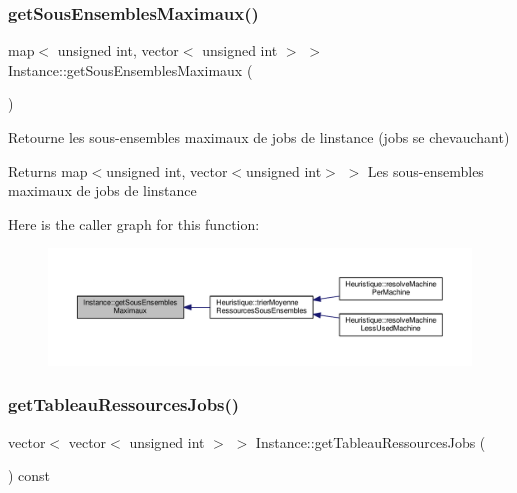 \subsubsection{\texorpdfstring{get\+Sous\+Ensembles\+Maximaux()}{getSousEnsemblesMaximaux()}}
{\footnotesize\ttfamily map$<$ unsigned int, vector$<$ unsigned int $>$ $>$ Instance\+::get\+Sous\+Ensembles\+Maximaux (\begin{DoxyParamCaption}{ }\end{DoxyParamCaption})}



Retourne les sous-\/ensembles maximaux de jobs de l\textquotesingle{}instance (jobs se chevauchant) 

\begin{DoxyReturn}{Returns}
map$<$unsigned int, vector$<$unsigned int$>$ $>$ Les sous-\/ensembles maximaux de jobs de l\textquotesingle{}instance 
\end{DoxyReturn}
Here is the caller graph for this function\+:\nopagebreak
\begin{figure}[H]
\begin{center}
\leavevmode
\includegraphics[width=350pt]{classInstance_a2011ff3253fcb1d2d354c3c34a14a6fb_icgraph}
\end{center}
\end{figure}
\mbox{\label{classInstance_ad4124bd2f1edb83a46ef94cfe07eafc8}} 
\subsubsection{\texorpdfstring{get\+Tableau\+Ressources\+Jobs()}{getTableauRessourcesJobs()}}
{\footnotesize\ttfamily vector$<$ vector$<$ unsigned int $>$ $>$ Instance\+::get\+Tableau\+Ressources\+Jobs (\begin{DoxyParamCaption}{ }\end{DoxyParamCaption}) const}



